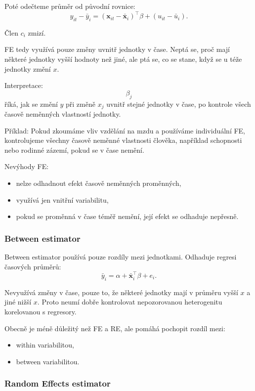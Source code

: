 Poté odečteme průměr od původní rovnice:
\[
    y_{it}-\bar y_i
    =
    (\mathbf x_{it}-\bar{\mathbf x}_i)^\top\beta
    +
    (u_{it}-\bar u_i).
\]

Člen $c_i$ zmizí.

FE tedy využívá pouze změny uvnitř jednotky v čase. Neptá se, proč mají některé jednotky vyšší
hodnoty než jiné, ale ptá se, co se stane, když se u téže jednotky změní $x$.

Interpretace:
\[
    \beta_j
\]
říká, jak se změní $y$ při změně $x_j$ uvnitř stejné jednotky v čase, po kontrole všech časově
neměnných vlastností jednotky.

Příklad: Pokud zkoumáme vliv vzdělání na mzdu a používáme individuální FE, kontrolujeme všechny
časově neměnné vlastnosti člověka, například schopnosti nebo rodinné zázemí, pokud se v čase nemění.

Nevýhody FE:
\begin{itemize}
    \item nelze odhadnout efekt časově neměnných proměnných,
    \item využívá jen vnitřní variabilitu,
    \item pokud se proměnná v čase téměř nemění, její efekt se odhaduje nepřesně.
\end{itemize}

\subsubsection{Between estimator}

Between estimator používá pouze rozdíly mezi jednotkami. Odhaduje regresi časových průměrů:
\[
    \bar y_i
    =
    \alpha
    +
    \bar{\mathbf x}_i^\top\beta
    +
    e_i.
\]

Nevyužívá změny v čase, pouze to, že některé jednotky mají v průměru vyšší $x$ a jiné nižší $x$.
Proto neumí dobře kontrolovat nepozorovanou heterogenitu korelovanou s regresory.

Obecně je méně důležitý než FE a RE, ale pomáhá pochopit rozdíl mezi:
\begin{itemize}
    \item within variabilitou,
    \item between variabilitou.
\end{itemize}

\subsubsection{Random Effects estimator}

